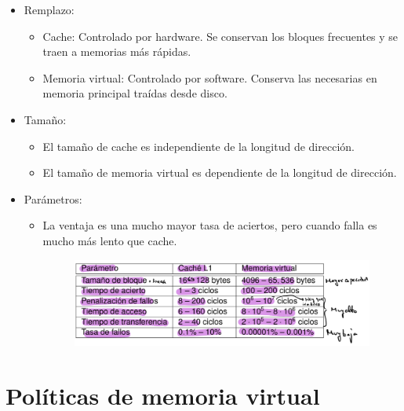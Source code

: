 \documentclass[12pt, twoside, openright]{report} %
\begin{document}
    \begin{itemize}
    
    \item
      Remplazo:

      \begin{itemize}
      
      \item
        Cache: Controlado por hardware. Se conservan los bloques
        frecuentes y se traen a memorias más rápidas.
      \item
        Memoria virtual: Controlado por software. Conserva las
        necesarias en memoria principal traídas desde disco.
      \end{itemize}
    \item
      Tamaño:

      \begin{itemize}
      
      \item
        El tamaño de cache es independiente de la longitud de dirección.
      \item
        El tamaño de memoria virtual es dependiente de la longitud de
        dirección.
      \end{itemize}
      \pagebreak
    \item
      Parámetros:

      \begin{itemize}
      \item
        La ventaja es una mucho mayor tasa de aciertos, pero cuando
        falla es mucho más lento que cache.
        \begin{figure}[H]
          {\includegraphics[scale=.4]{Untitled 28.png}}
        \end{figure}
      \end{itemize}
    \end{itemize}

 \section{Políticas de memoria virtual}
\end{document}
